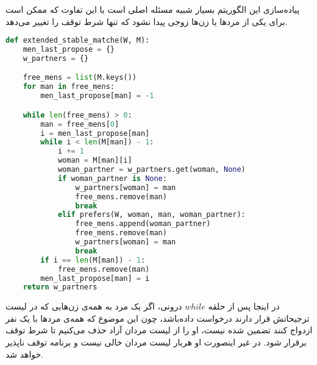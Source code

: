 \documentclass[]{article}
\begin{document}
پیاده‌سازی این الگوریتم بسیار شبیه مسئله اصلی است با این تفاوت که
ممکن است برای یکی از مرد‌ها یا زن‌ها زوجی پیدا نشود که تنها شرط توقف را تغییر می‌دهد.
\begin{latin}
\begin{lstlisting}[language=python]
def extended_stable_matche(W, M):
    men_last_propose = {}
    w_partners = {}

    free_mens = list(M.keys())
    for man in free_mens:
        men_last_propose[man] = -1

    while len(free_mens) > 0:
        man = free_mens[0]
        i = men_last_propose[man]
        while i < len(M[man]) - 1:
            i += 1
            woman = M[man][i]
            woman_partner = w_partners.get(woman, None)
            if woman_partner is None:
                w_partners[woman] = man
                free_mens.remove(man)
                break
            elif prefers(W, woman, man, woman_partner):
                free_mens.append(woman_partner)
                free_mens.remove(man)
                w_partners[woman] = man
                break
        if i == len(M[man]) - 1:
            free_mens.remove(man)
        men_last_propose[man] = i
    return w_partners
\end{lstlisting}
\end{latin}
در اینجا پس از حلقه $while$ درونی، اگر یک مرد به همه‌ی زن‌هایی که
در لیست ترجیحاتش قرار دارند درخواست داده‌باشد، چون این موضوع که همه‌ی مرد‌ها با یک نفر ازدواج
کنند تضمین شده نیست، او را از لیست مردان آزاد حذف می‌کنیم تا شرط توقف برقرار شود.
در غیر اینصورت او هربار لیست مردان خالی نیست و برنامه توقف ناپذیر خواهد شد.
\end{document}
